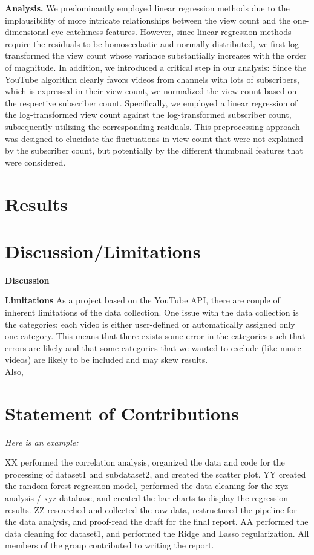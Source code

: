 \documentclass{article}
\begin{document}
\textbf{Analysis.} We predominantly employed linear regression methods due to the implausibility of more intricate relationships between the view count and the one-dimensional eye-catchiness features. However, since linear regression methods require the residuals to be homoscedastic and normally distributed, we first log-transformed the view count whose variance substantially increases with the order of magnitude. In addition, we introduced a critical step in our analysis: Since the YouTube algorithm clearly favors videos from channels with lots of subscribers, which is expressed in their view count, we normalized the view count based on the respective subscriber count. Specifically, we employed a linear regression of the log-transformed view count against the log-transformed subscriber count, subsequently utilizing the corresponding residuals. This preprocessing approach was designed to elucidate the fluctuations in view count that were not explained by the subscriber count, but potentially by the different thumbnail features that were considered.


\section{Results}


\section{Discussion/Limitations}
\textbf{Discussion }

\textbf{Limitations } As a project based on the YouTube API, there are couple of inherent limitations of the data collection. One issue with the data collection is the categories: each video is either user-defined or automatically assigned only one category. This means that there exists some error in the categories such that errors are likely and that some categories that we wanted to exclude (like music videos) are likely to be included and may skew results. \\
Also, 


\section{Statement of Contributions}

\emph{Here is an example:}

XX performed the correlation analysis, organized the data and code for the processing of dataset1 and subdataset2, and created the scatter plot. 
YY created the random forest regression model, performed the data cleaning for the xyz analysis / xyz database, and created the bar charts to display the regression results. 
ZZ researched and collected the raw data, restructured the pipeline for the data analysis, and proof-read the draft for the final report. 
AA performed the data cleaning for dataset1, and performed the Ridge and Lasso regularization. 
All members of the group contributed to writing the report.




\end{document}
